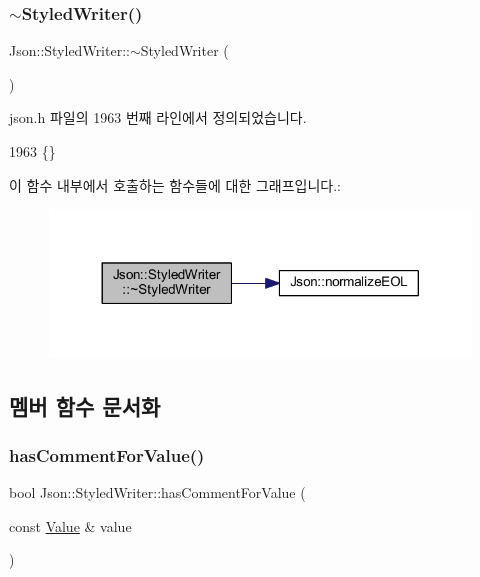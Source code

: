 \subsubsection{\texorpdfstring{$\sim$\+Styled\+Writer()}{~StyledWriter()}}
{\footnotesize\ttfamily Json\+::\+Styled\+Writer\+::$\sim$\+Styled\+Writer (\begin{DoxyParamCaption}{ }\end{DoxyParamCaption})\hspace{0.3cm}{\ttfamily [inline]}}



json.\+h 파일의 1963 번째 라인에서 정의되었습니다.


\begin{DoxyCode}
1963 \{\}
\end{DoxyCode}
이 함수 내부에서 호출하는 함수들에 대한 그래프입니다.\+:\nopagebreak
\begin{figure}[H]
\begin{center}
\leavevmode
\includegraphics[width=317pt]{class_json_1_1_styled_writer_a6a18380a4c5dd5e37a892dc182aac88c_cgraph}
\end{center}
\end{figure}


\subsection{멤버 함수 문서화}
\mbox{\label{class_json_1_1_styled_writer_a37a806d010f708cb68556f2666f79bdf}} 
\subsubsection{\texorpdfstring{has\+Comment\+For\+Value()}{hasCommentForValue()}}
{\footnotesize\ttfamily bool Json\+::\+Styled\+Writer\+::has\+Comment\+For\+Value (\begin{DoxyParamCaption}\item[{const \hyperlink{class_json_1_1_value}{Value} \&}]{value }\end{DoxyParamCaption})\hspace{0.3cm}{\ttfamily [private]}}



